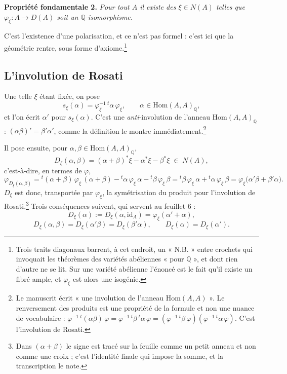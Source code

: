 \documentclass[11pt,a4paper]{article}
\begin{document}
\textbf{Propriété fondamentale 2.} \emph{Pour tout $A$ il existe des
$\xi \in N(A)$ telles que $\varphi_{\xi} : A \to D(A)$ soit un
$\mathbb{Q}$-isomorphisme.}

C'est l'existence d'une polarisation, et ce n'est pas
formel : c'est ici que la géométrie rentre, sous forme d'axiome.\footnote{Trois
traits diagonaux barrent, à cet endroit, un « N.B. » entre crochets qui
invoquait les théorèmes des variétés abéliennes « pour $\mathbb{Q}$ », et dont
rien d'autre ne se lit. Sur une variété abélienne l'énoncé est le fait qu'il existe un fibré
ample, et $\varphi_{\xi}$ est alors une isogénie.}

\subsection*{L'involution de Rosati}

Une telle $\xi$ étant fixée, on pose
\[
  s_{\xi}(\alpha) = \varphi_{\xi}^{-1} \, {}^{t}\alpha \, \varphi_{\xi},
  \qquad \alpha \in \mathrm{Hom}(A,A)_{\mathbb{Q}},
\]
et l'on écrit $\alpha'$ pour $s_{\xi}(\alpha)$. C'est une
\emph{anti}-involution de l'anneau $\mathrm{Hom}(A,A)_{\mathbb{Q}}$ :
$(\alpha\beta)' = \beta'\alpha'$, comme la définition le montre
immédiatement.\footnote{Le manuscrit écrit « une involution de l'anneau
$\mathrm{Hom}(A,A)$ ». Le renversement des produits est une propriété de la
formule et non une nuance de vocabulaire : $\varphi^{-1}\,{}^{t}(\alpha\beta)\,
\varphi = \varphi^{-1}\,{}^{t}\beta\,{}^{t}\alpha\,\varphi =
(\varphi^{-1}\,{}^{t}\beta\,\varphi)(\varphi^{-1}\,{}^{t}\alpha\,\varphi)$.
C'est l'involution de Rosati.}

Il pose ensuite, pour $\alpha, \beta \in \mathrm{Hom}(A,A)_{\mathbb{Q}}$,
\[
  D_{\xi}(\alpha,\beta) = (\alpha+\beta)^{*}\xi - \alpha^{*}\xi -
  \beta^{*}\xi \;\in\; N(A),
\]
c'est-à-dire, en termes de $\varphi$,
\[
  \varphi_{D_{\xi}(\alpha,\beta)} =
  {}^{t}(\alpha+\beta)\,\varphi_{\xi}\,(\alpha+\beta)
  - {}^{t}\alpha\,\varphi_{\xi}\,\alpha
  - {}^{t}\beta\,\varphi_{\xi}\,\beta
  = {}^{t}\beta\,\varphi_{\xi}\,\alpha + {}^{t}\alpha\,\varphi_{\xi}\,\beta
  = \varphi_{\xi}\bigl(\alpha'\beta + \beta'\alpha\bigr).
\]
$D_{\xi}$ est donc, transportée par $\varphi_{\xi}$, la symétrisation du
produit pour l'involution de Rosati.\footnote{Dans $(\alpha+\beta)$ le signe
est tracé sur la feuille comme un petit anneau et non comme une croix ; c'est
l'identité finale qui impose la somme, et la transcription le note.} Trois
conséquences suivent, qui servent au feuillet 6 :
\[
  D_{\xi}(\alpha) := D_{\xi}(\alpha, \mathrm{id}_{A}) =
  \varphi_{\xi}(\alpha' + \alpha),
\]
\[
  D_{\xi}(\alpha,\beta) = D_{\xi}(\alpha'\beta) = D_{\xi}(\beta'\alpha),
  \qquad D_{\xi}(\alpha) = D_{\xi}(\alpha').
\]
\end{document}
